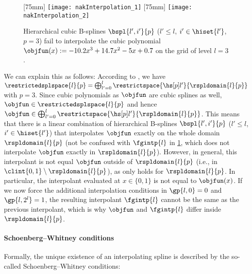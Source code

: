 \begin{figure}
  [75mm]{%
    \texttt{[image: nakInterpolation\_1]}%
  }%
  \hfill%
  [75mm]{%
    \texttt{[image: nakInterpolation\_2]}%
  }%
  \caption[%
    Issues when interpolating with uniform hierarchical B-splines%
  ]{%
    Hierarchical cubic B-splines $\bspl{l',i'}{p}$
    ($l' \le l$, $i' \in \hiset{l'}$, $p = 3$)
    fail to interpolate the cubic polynomial
    $\objfun(x) := -10.2 x^3 + 14.7 x^2 - 5x + 0.7$
    on the grid of level $l = 3$.%
  }%
  \label{fig:nakInterpolation}%
\end{figure}

We can explain this as follows:
According to ,
we have $\restrictedsplspace{l}{p} = \bigoplus_{l'=0}^l \restrictspace{\hsbspl{l'}{p}}{\rspldomain{l}{p}}$
with $p = 3$.
Since cubic polynomials as $\objfun$ are cubic splines as well,
$\objfun \in \restrictedsplspace{l}{p}$ and hence
$\objfun \in \bigoplus_{l'=0}^l \restrictspace{\hsbspl{l'}{p}}{\rspldomain{l}{p}}$.
This means that there is a linear combination of hierarchical B-splines
$\bspl{l',i'}{p}$ ($l' \le l$, $i' \in \hiset{l'}$)
that interpolates $\objfun$ exactly on the whole domain $\rspldomain{l}{p}$
(not be confused with $\fgintp{l}$ in \cref{fig:nakInterpolation},
which does not interpolate $\objfun$ exactly in $\rspldomain{l}{p}$).
However, in general, this interpolant is not equal $\objfun$ outside
of $\rspldomain{l}{p}$ (i.e., in $\clint{0, 1} \setminus \rspldomain{l}{p}$),
as  only holds for $\rspldomain{l}{p}$.
In particular, the interpolant evaluated at $x \in \{0, 1\}$ is not
equal to $\objfun(x)$.
If we now force the additional interpolation conditions in
$\gp{l,0} = 0$ and $\gp{l,2^l} = 1$,
the resulting interpolant $\fgintp{l}$ cannot be the same as the previous
interpolant,
which is why $\objfun$ and $\fgintp{l}$ differ inside $\rspldomain{l}{p}$.

\paragraph{Schoenberg--Whitney conditions}

Formally, the unique existence of an interpolating spline is
described by the so-called Schoenberg--Whitney conditions:

